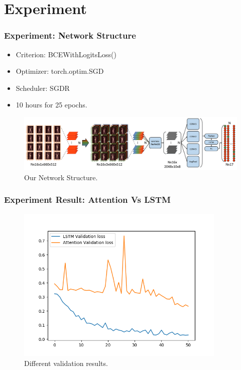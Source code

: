 \documentclass{beamer}
\begin{document}
\section{Experiment} %

\begin{frame}
\frametitle{Experiment: Network Structure}
	\begin{itemize}
		\item Criterion: BCEWithLogitsLoss()
		\item Optimizer: torch.optim.SGD
		\item Scheduler: SGDR
		\item 10 hours for 25 epochs.
	\end{itemize}
	\begin{figure}
		\centering
		\includegraphics[width=12cm]{../Pic/Network.pdf}
		\caption{Our Network Structure.}
	\end{figure}

\end{frame}

\begin{frame}
\frametitle{Experiment Result: Attention Vs LSTM}

	\begin{figure}
		\centering
		\includegraphics[width=10cm]{../Pic/2models.png}
		\caption{Different validation results.}
	\end{figure}
	
\end{frame}
\end{document}

